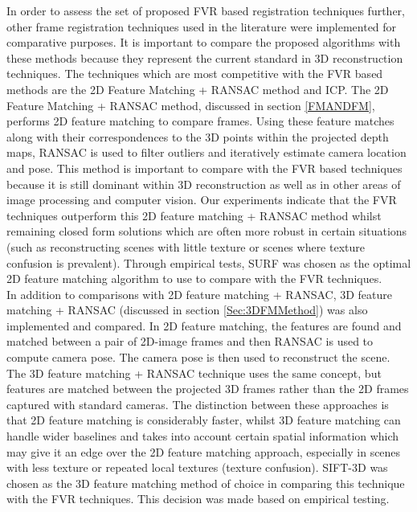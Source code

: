 
In order to assess the set of proposed FVR based registration techniques further, other frame registration techniques used in the literature were implemented for comparative purposes. It is important to compare the proposed algorithms with these methods because they represent the current standard in 3D reconstruction techniques. The techniques which are most competitive with the FVR based methods are the 2D Feature Matching + RANSAC method and ICP. The 2D Feature Matching + RANSAC method, discussed in section \ref{FMANDFM}, performs 2D feature matching to compare frames. Using these feature matches along with their correspondences to the 3D points within the projected depth maps, RANSAC is used to filter outliers and iteratively estimate camera location and pose. This method is important to compare with the FVR based techniques because it is still dominant within 3D reconstruction as well as in other areas of image processing and computer vision. Our experiments indicate that the FVR techniques outperform this 2D feature matching + RANSAC method whilst remaining closed form solutions which are often more robust in certain situations (such as reconstructing scenes with little texture or scenes where texture confusion is prevalent). Through empirical tests, SURF was chosen as the optimal 2D feature matching algorithm to use to compare with the FVR techniques. \\ 


In addition to comparisons with 2D feature matching + RANSAC, 3D feature matching + RANSAC (discussed in section \ref{Sec:3DFMMethod}) was also implemented and compared. In 2D feature matching, the features are found and matched between a pair of 2D-image frames and then RANSAC is used to compute camera pose. The camera pose is then used to reconstruct the scene. The 3D feature matching + RANSAC technique uses the same concept, but features are matched between the projected 3D frames rather than the 2D frames captured with standard cameras. The distinction between these approaches is that 2D feature matching is considerably faster, whilst 3D feature matching can handle wider baselines and takes into account certain spatial information which may give it an edge over the 2D feature matching approach, especially in scenes with less texture or repeated local textures (texture confusion). SIFT-3D was chosen as the 3D feature matching method of choice in comparing this technique with the FVR techniques. This decision was made based on empirical testing. \\

